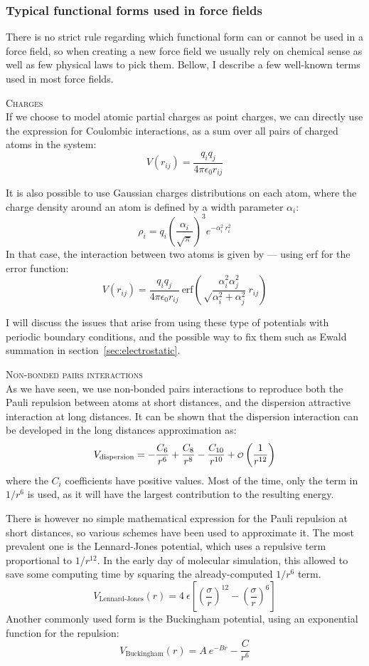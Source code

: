 \documentclass[thesis]{subfiles}
\begin{document}
\subsubsection{Typical functional forms used in force fields}

There is no strict rule regarding which functional form can or cannot be used in
a force field, so when creating a new force field we usually rely on chemical
sense as well as few physical laws to pick them. Bellow, I describe a few
well-known terms used in most force fields.

\textsc{Charges}\\[0.1\baselineskip]
If we choose to model atomic partial charges as point charges, we can directly
use the expression for Coulombic interactions, as a sum over all pairs of
charged atoms in the system:
\[ V(r_{ij}) = \frac{q_i q_j}{4 \pi \epsilon_0 r_{ij}}\]

It is also possible to use Gaussian charges distributions on each atom, where
the charge density around an atom is defined by a width parameter $\alpha_i$:
\[\rho_i = q_i \left(\frac{\alpha_i}{\sqrt\pi}\right)^3 e^{-\alpha_i^2 \ r_i^2}\]
In that case, the interaction between two atoms is given by --- using erf for
the error function:
\[ V(r_{ij}) = \frac{q_i q_j}{4 \pi \epsilon_0 r_{ij}}\ \text{erf}\left(\sqrt\frac{\alpha_i^2\alpha_j^2}{\alpha_i^2 + \alpha_j^2} \ r_{ij}\right)\]

I will discuss the issues that arise from using these type of potentials with
periodic boundary conditions, and the possible way to fix them such as Ewald
summation in section~\ref{sec:electrostatic}.

\textsc{Non-bonded pairs interactions}\\[0.1\baselineskip]
As we have seen, we use non-bonded pairs interactions to reproduce both the
Pauli repulsion between atoms at short distances, and the dispersion attractive
interaction at long distances. It can be shown\cite{London1930} that the
dispersion interaction can be developed in the long distances approximation as:
\[ V_\text{dispersion} = -\frac{C_6}{r^6} + \frac{C_8}{r^8} - \frac{C_{10}}{r^{10}} + {\scriptstyle\mathcal{O}}\left(\frac{1}{r^{12}}\right) \]
where the $C_i$ coefficients have positive values. Most of the time, only the
term in $1/r^6$ is used, as it will have the largest contribution to the
resulting energy.

There is however no simple mathematical expression for the Pauli repulsion at
short distances, so various schemes have been used to approximate it. The most
prevalent one is the Lennard-Jones potential, which uses a repulsive term
proportional to $1/r^{12}$. In the early day of molecular simulation, this
allowed to save some computing time by squaring the already-computed $1/r^6$
term.
\[V_\text{Lennard-Jones}(r) = 4 \ \epsilon \left[\left(\frac{\sigma}{r}\right)^{12} - \left(\frac{\sigma}{r}\right)^6\right]\]
Another commonly used form is the Buckingham potential, using an exponential
function for the repulsion:
\[V_\text{Buckingham}(r) = A \ e^{-B r} - \frac{C}{r^6}\]
\end{document}
